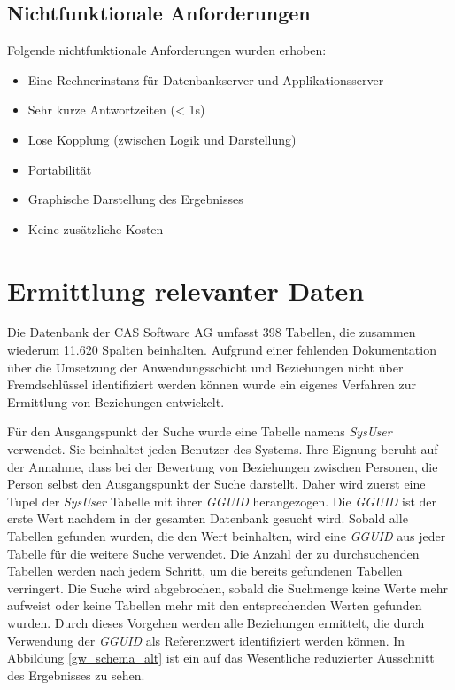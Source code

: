 \subsection{Nichtfunktionale Anforderungen}

Folgende nichtfunktionale Anforderungen wurden erhoben:

\begin{itemize}
	
	\item Eine Rechnerinstanz für Datenbankserver und Applikationsserver 
	
	\item Sehr kurze Antwortzeiten (< 1s)
	
	\item Lose Kopplung (zwischen Logik und Darstellung)
	
	\item Portabilität
	
	\item Graphische Darstellung des Ergebnisses
	
	\item Keine zusätzliche Kosten

\end{itemize}

\section{Ermittlung relevanter Daten}
\label{ch:Systemanalyse:sec:Information}

Die Datenbank der CAS Software AG umfasst 398 Tabellen, die zusammen wiederum 11.620 Spalten beinhalten. Aufgrund einer fehlenden Dokumentation über die Umsetzung der Anwendungsschicht und Beziehungen nicht über Fremdschlüssel identifiziert werden können wurde ein eigenes Verfahren zur Ermittlung von Beziehungen entwickelt. 

Für den Ausgangspunkt der Suche wurde eine Tabelle namens \textit{SysUser} verwendet. Sie beinhaltet jeden Benutzer des Systems. Ihre Eignung beruht auf der Annahme, dass bei der Bewertung von Beziehungen zwischen Personen, die Person selbst den Ausgangspunkt der Suche darstellt. Daher wird zuerst eine Tupel der \textit{SysUser} Tabelle mit ihrer \textit{GGUID} herangezogen. Die \textit{GGUID} ist der erste Wert nachdem in der gesamten Datenbank gesucht wird. Sobald alle Tabellen gefunden wurden, die den Wert beinhalten, wird eine \textit{GGUID} aus jeder Tabelle für die weitere Suche verwendet. Die Anzahl der zu durchsuchenden Tabellen werden nach jedem Schritt, um die bereits gefundenen Tabellen verringert. Die Suche wird abgebrochen, sobald die Suchmenge keine Werte mehr aufweist oder keine Tabellen mehr mit den entsprechenden Werten gefunden wurden. Durch dieses Vorgehen werden alle Beziehungen ermittelt, die durch Verwendung der \textit{GGUID} als Referenzwert identifiziert werden können. In Abbildung \ref{gw_schema_alt} ist ein auf das Wesentliche reduzierter Ausschnitt des Ergebnisses zu sehen. 

